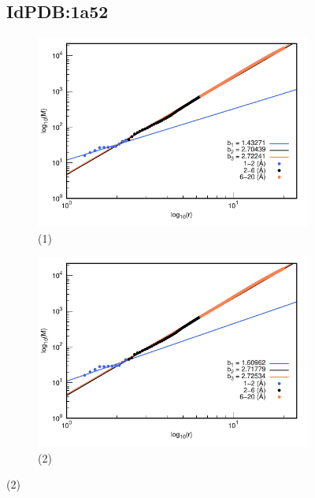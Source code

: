 \begin{figure}[H]
	\subsection*{IdPDB:1a52}
	
	\hspace{-0.3cm} 
	\begin{subfigure}{0.49\textwidth}
		\centering
		\includegraphics[width=\linewidth,page=1]{graphs/PDBs/1a52/1a52addH.pdf}
		\caption{(1)}
	\end{subfigure}
	\hspace{0.2cm}
	\begin{subfigure}{0.49\textwidth}
		\centering
		\includegraphics[width=\linewidth,page=1]{graphs/PDBs/1a52/1a52Em.pdf}
		\caption{(2)}
	\end{subfigure}
	

\end{figure}

